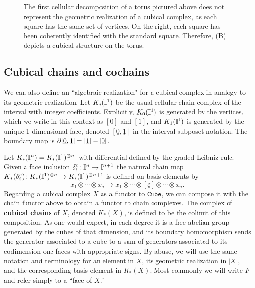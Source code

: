 \begin{figure}
	
	\caption{The first cellular decomposition of a torus pictured above does not represent the geometric realization of a cubical complex, as each square has the same set of vertices.
	On the right, each square has been coherently identified with the standard square.
	Therefore, (B) depicts a cubical structure on the torus.}
	\label{F: cubical structure}
\end{figure}

\subsection{Cubical chains and cochains}\label{S: cubical cochains}

We can also define an ``algebraic realization" for a cubical complex in analogy to its geometric realization.
Let $K_*(\mathbb{I}^1)$ be the usual cellular chain complex of the interval with integer coefficients.
Explicitly, $K_0(\mathbb{I}^1)$ is generated by the vertices, which we write in this context as $[\underline{0}]$ and $[\underline{1}]$, and $K_1(\mathbb{I}^1)$ is generated by the unique 1-dimensional face, denoted $[\underline{0},\underline{1}]$ in the interval subposet notation.
The boundary map is $\partial [\underline{0},\underline{1}] = [\underline{1}]-[\underline{0}]$.

Let $K_*(\mathbb{I}^n) = K_*(\mathbb{I}^1)^{ \otimes n}$, with differential defined by the graded Leibniz rule.
Given a face inclusion $\delta_i^{\varepsilon} \colon \mathbb{I}^n \to \mathbb{I}^{n+1}$ the natural chain map $K_*(\delta_i^{\varepsilon}) \colon K_*(\mathbb{I}^1)^{ \otimes n} \to K_*(\mathbb{I}^1)^{ \otimes n+1}$ is defined on basis elements by
\begin{equation*}
	x_1 \otimes \cdots \otimes x_n \mapsto
	x_1 \otimes \cdots \otimes [\underline{\varepsilon}] \otimes \cdots \otimes x_n.
\end{equation*}
Regarding a cubical complex $X$ as a functor to $\mathtt{Cube}$, we can compose it with the chain functor above to obtain a functor to chain complexes.
The complex of \textbf{cubical chains} of $X$, denoted $K_*(X)$, is defined to be the colimit of this composition.
As one would expect, in each degree it is a free abelian group generated by the cubes of that dimension, and its boundary homomorphism sends the
generator associated to a cube to a sum of generators associated to its codimension-one faces with appropriate signs.
By abuse, we will use the same notation and terminology for an element in $X$, its geometric realization in $|X|$,
and the corresponding basis element in $K_*(X)$.
Most commonly we will write $F$ and refer simply to a ``face of $X$.''

